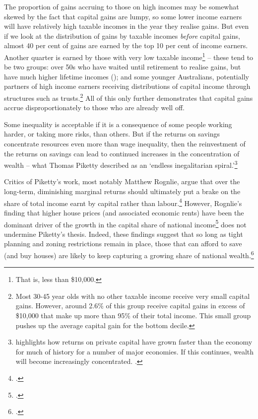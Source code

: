 The proportion of gains accruing to those on high incomes may be somewhat skewed by the fact that capital gains are lumpy, so some lower income earners will have relatively high taxable incomes in the year they realise gains. But even if we look at the distribution of gains by taxable incomes \emph{before} capital gains, almost 40 per cent of gains are earned by the top 10 per cent of income earners. Another quarter is earned by those with very low taxable income\footnote{That is, less than \$10,000.}  – these tend to be two groups: over 50s who have waited until retirement to realise gains, but have much higher lifetime incomes (); and some younger Australians, potentially partners of high income earners receiving distributions of capital income through structures such as trusts.\footnote{Most 30-45 year olds with no other taxable income receive very small capital gains. However, around 2.6\% of this group receive capital gains in excess of \$10,000 that make up more than 95\% of their total income. This small group pushes up the average capital gain for the bottom decile.} All of this only further demonstrates that capital gains accrue disproportionately to those who are already well off. 

Some inequality is acceptable if it is a consequence of some people working harder, or taking more risks, than others. But if the returns on savings concentrate resources even more than wage inequality, then the reinvestment of the returns on savings can lead to continued increases in the concentration of wealth – what Thomas Piketty described as an ‘endless inegalitarian spiral.’\footnote{\textcite{Piketty2013} highlights how returns on private capital have grown faster than the economy for much of history for a number of major economies. If this continues, wealth will become increasingly concentrated. \textcite[See also:][]{Leigh2013}.}

Critics of Piketty’s work, most notably Matthew Rognlie, argue that over the long-term, diminishing marginal returns should ultimately put a brake on the share of total income earnt by capital rather than labour.\footcite[][2]{Rognlie2014OnPiketty} However, Rognlie’s finding that higher house prices (and associated economic rents) have been the dominant driver of the growth in the capital share of national income\footcite[][3]{Rognlie2014OnPiketty} does not undermine Piketty’s thesis. Indeed, these findings suggest that so long as tight planning and zoning restrictions remain in place, those that can afford to save (and buy houses) are likely to keep capturing a growing share of national wealth.\footcite[See:][]{TheEconomist2015NIMBYs}  

